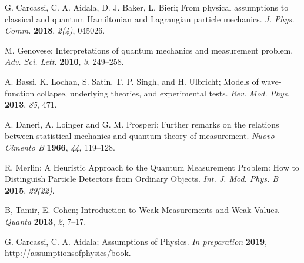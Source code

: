 \documentclass[applsci,article,submit,moreauthors,pdftex]{Definitions/mdpi}
\begin{document}





\begin{thebibliography}{999}

G. Carcassi, C. A. Aidala, D. J. Baker, L. Bieri; From physical assumptions to classical and quantum {Hamiltonian} and {Lagrangian} particle mechanics. {\em J. Phys. Comm.} {\bf 2018}, {\em 2(4)}, 045026.

M. Genovese; Interpretations of quantum mechanics and measurement problem. {\em Adv. Sci. Lett.} {\bf 2010}, {\em 3}, 249--258.

A. Bassi, K. Lochan, S. Satin, T. P. Singh, and H. Ulbricht; Models of wave-function collapse, underlying theories, and experimental tests. {\em Rev. Mod. Phys.} {\bf 2013}, {\em 85}, 471.

A. Daneri, A. Loinger and G. M. Prosperi; Further remarks on the relations between statistical mechanics and quantum theory of measurement. {\em Nuovo Cimento B} {\bf 1966}, {\em 44}, 119--128.

R. Merlin; A Heuristic Approach to the Quantum Measurement Problem: How to Distinguish Particle Detectors from Ordinary Objects. {\em Int. J. Mod. Phys. B} {\bf 2015}, {\em 29(22)}.

B, Tamir, E. Cohen; Introduction to Weak Measurements and Weak Values. {\em Quanta} {\bf 2013}, {\em 2}, 7–17.

G. Carcassi, C. A. Aidala; Assumptions of Physics. {\em In preparation} {\bf 2019}, http://assumptionsofphysics/book.

\end{thebibliography}
\end{document}

